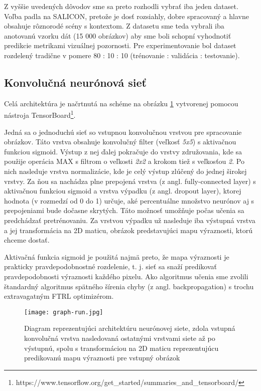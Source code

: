 Z vyššie uvedených dôvodov sme sa preto rozhodli vybrať iba jeden dataset. Voľba padla na SALICON, pretože je dosť rozsiahly, dobre spracovaný a hlavne obsahuje rôznorodé scény s kontextom. Z datasetu sme teda vybrali iba anotovanú vzorku dát (15 000 obrázkov) aby sme boli schopní vyhodnotiť predikcie metrikami vizuálnej pozornosti. Pre experimentovanie bol dataset rozdelený tradične v pomere 80 : 10 : 10 (trénovanie : validácia : testovanie).

\subsection{Konvolučná neurónová sieť}
\label{nn_popis}

Celá architektúra je načrtnutá na schéme na obrázku \ref{my_tensorboard_cnn} vytvorenej pomocou nástroja  TensorBoard\footnote{https://www.tensorflow.org/get\_started/summaries\_and\_tensorboard/}.

Jedná sa o jednoduchú sieť so vstupnou konvolučnou vrstvou pre spracovanie obrázkov. Táto vrstva obsahuje konvolučný filter (veľkosť \textit{5x5}) s aktivačnou funkciou sigmoid. Výstup z nej ďalej pokračuje do vrstvy združovania, kde sa použije operácia MAX s filtrom o veľkosti \textit{2x2} a krokom tiež s veľkosťou \textit{2}. Po nich nasleduje vrstva normalizácie, kde je celý výstup zlúčený do jednej širokej vrstvy. Za ňou sa nachádza plne prepojená vrstva (z angl. fully-connected layer) s aktivačnou funkciou sigmoid a vrstva výpadku (z angl. dropout layer\cite{dropout}), ktorej hodnota (v rozmedzí od 0 do 1) určuje, aké percentuálne množstvo neurónov aj s prepojeniami bude dočasne skrytých. Táto možnosť umožňuje počas učenia sa predchádzať pretrénovaniu. Za vrstvou výpadku už nasleduje iba výstupná vrstva a jej transformácia na 2D maticu, obrázok predstavujúci mapu výraznosti, ktorú chceme dostať.

Aktivačná funkcia sigmoid je použitá najmä preto, že mapa výraznosti je prakticky pravdepodobnostné rozdelenie, t. j. sieť sa snaží predikovať pravdepodobnosti výraznosti každého pixelu. Ako algoritmus učenia sme zvolili štandardný algoritmus spätného šírenia chyby (z angl. backpropagation) s trochu extravagatným FTRL optimizérom.

\begin{figure}[H]
	\begin{center}\texttt{[image: graph-run.jpg]}
		\caption[Návrh architektúry neurónovej siete]{
			Diagram reprezentujúci architektúru neurónovej siete, zdola vstupná konvolučná vrstva nasledovaná ostatnými vrstvami siete až po výstupnú, spolu s transformáciou na 2D maticu reprezentujúcu predikovanú mapu výraznosti pre vstupný obrázok
		}\label{my_tensorboard_cnn}
	\end{center}
\end{figure}

